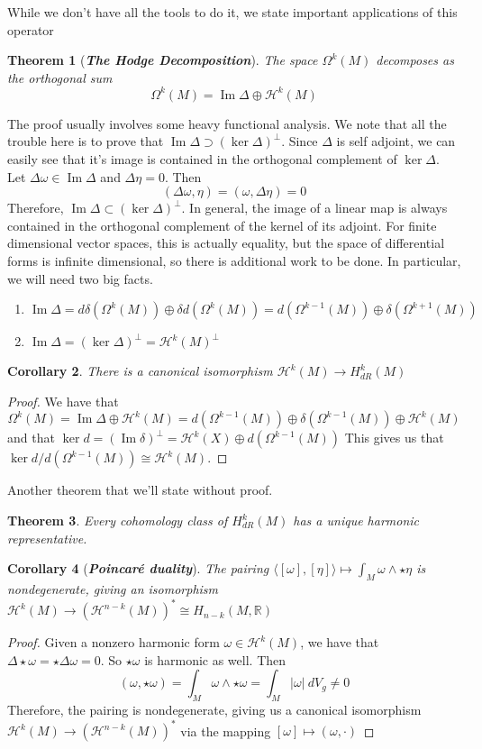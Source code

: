 \documentclass[psamsfonts]{amsart}
\newtheorem{thm}{Theorem}[section]
\newtheorem{cor}[thm]{Corollary}
\theoremstyle{definition}
\theoremstyle{remark}
\newcommand{\R}{\mathbb{R}}
\newcommand{\ib}[1]{\textbf{\textit{#1}}}
\DeclareMathOperator{\im}{Im}
\begin{document}
While we don't have all the tools to do it, we state important applications of this operator
\begin{thm}[\ib{The Hodge Decomposition}]
The space $\Omega^k(M)$ decomposes as the orthogonal sum
$$\Omega^k(M) = \im \Delta \oplus \mathcal{H}^k(M) $$
\end{thm}
The proof usually involves some heavy functional analysis. We note that all the trouble here is to prove that $\im \Delta \supset (\ker\Delta)^\perp$. Since $\Delta$ is self adjoint, we can easily see that it's image is contained in the orthogonal complement of $\ker \Delta$. Let $\Delta \omega \in \im \Delta$ and $\Delta \eta = 0$. Then
$$(\Delta\omega, \eta) = (\omega,\Delta\eta) = 0 $$
Therefore, $\im\Delta \subset (\ker\Delta)^\perp$. In general, the image of a linear map is always contained in the orthogonal complement of the kernel of its adjoint. For finite dimensional vector spaces, this is actually equality, but the space of differential forms is infinite dimensional, so there is additional work to be done. In particular, we will need two big facts.
\begin{enumerate}
\item $\im \Delta = d\delta(\Omega^k(M)) \oplus \delta d(\Omega^k(M)) = d(\Omega^{k-1}(M)) \oplus \delta(\Omega^{k+1}(M))$
\item $\im \Delta = (\ker\Delta)^\perp = \mathcal{H}^k(M)^\perp$
\end{enumerate} 
\begin{cor}
There is a canonical isomorphism $\mathcal{H}^k(M) \to H^k_{dR}(M)$
\end{cor}
\begin{proof}
We have that 
$$\Omega^k(M) = \im\Delta \oplus \mathcal{H}^k(M) = d(\Omega^{k-1}(M)) \oplus \delta(\Omega^{k-1}(M)) \oplus \mathcal{H}^k(M)$$
and that $\ker d = (\im \delta)^\perp = \mathcal{H}^k(X) \oplus d(\Omega^{k-1}(M))$ This gives us that $\ker d / d(\Omega^{k-1}(M)) \cong \mathcal{H}^k(M)$.
\end{proof}
Another theorem that we'll state without proof.
\begin{thm}
Every cohomology class of $H^k_{dR}(M)$ has a unique harmonic representative.
\end{thm}
\begin{cor}[\ib{Poincar\'e duality}]
The pairing $\langle [\omega], [\eta]\rangle \mapsto \int_M \omega \wedge \star\eta$ is nondegenerate, giving an isomorphism $\mathcal{H}^{k}(M)\to(\mathcal{H}^{n-k}(M))^* \cong H_{n-k}(M, \R)$
\end{cor}
\begin{proof}
Given a nonzero harmonic form $\omega \in \mathcal{H}^k(M)$, we have that $\Delta\star\omega = \star\Delta\omega = 0$. So $\star\omega$ is harmonic as well. Then 
$$(\omega, \star\omega) = \int_M \omega\wedge\star\omega = \int_M|\omega|~dV_g \neq 0$$
Therefore, the pairing is nondegenerate, giving us a canonical isomorphism $\mathcal{H}^k(M) \to \left(\mathcal{H}^{n-k}(M)\right)^*$ via the mapping $[\omega] \mapsto (\omega, \cdot)$
\end{proof}
%
\end{document}
